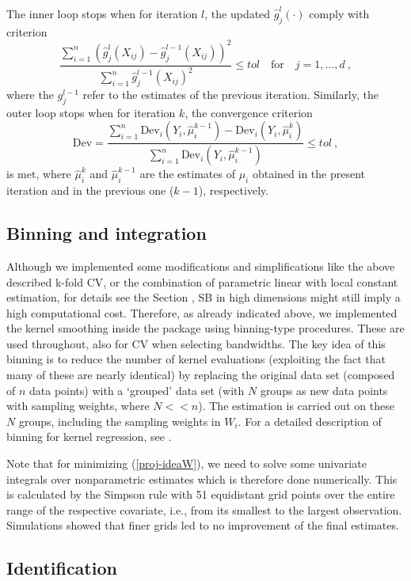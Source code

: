 The inner loop stops when for iteration $l$, the updated $\hat g_j^l (\cdot)$ comply with criterion
\[
\frac{\sum_{i=1}^n \left(  {\hat g_j^l(X_{ij})-\hat g_j^{l-1}(X_{ij})}\right)^2}{\sum_{i=1}^n \hat g_j^{l-1}(X_{ij})^2}\leq tol \quad \mbox{for} \quad j=1,\ldots,d\ ,
\]
where the $g^{l-1}_j$ refer to the estimates of the previous iteration.
%
Similarly, the outer loop stops when for iteration $k$, the convergence criterion
\[
\mbox{Dev}= \frac {\sum_{i=1}^n \mbox{Dev}_i (Y_i, \hat \mu_i^{k-1})-\mbox{Dev}_i (Y_i, \hat \mu_i^k)} {\sum_{i=1}^n \mbox{Dev}_i (Y_i, \hat \mu_i^{k-1})}\leq tol\ ,
\]
is met,  where $\hat \mu_i^k$ and $\hat \mu_i^{k-1}$ are the estimates of $\mu_i$ obtained in the present iteration and in the previous one ($k-1$), respectively. 

\subsection{Binning and integration}

Although we implemented some modifications and simplifications like the above described k-fold CV, or the combination of parametric linear with local constant estimation, for details see the Section ,   
SB in high dimensions might still imply a high computational cost. 
%
Therefore, as already indicated above, we implemented the kernel smoothing inside the  package using binning-type procedures. These are used throughout, also for CV when selecting  bandwidths.
The key idea of this binning is to reduce the number of kernel evaluations (exploiting the fact that many of these are nearly identical) by replacing the original data set (composed of $n$ data points) with a `grouped' data set (with $N$ groups as new data points with sampling weights, where $N << n$). The estimation is carried out on these $N$ groups, including the sampling weights in $W_i$. For a detailed description of binning for kernel regression, see \cite{FG1996}.

Note that for minimizing (\ref{proj-ideaW}), we need to solve some univariate integrals 
over nonparametric estimates which is therefore done numerically. This is calculated by the Simpson rule with 51 equidistant grid points over the entire range of the respective covariate, i.e., from its smallest to the largest observation. 
Simulations showed that finer grids led to no improvement of the final estimates.  
 


\subsection{Identification} \label{identification}

